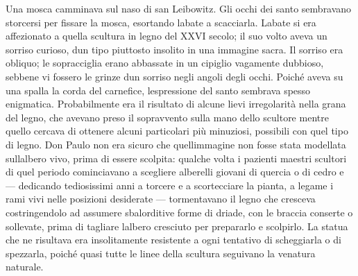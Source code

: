 Una mosca camminava sul naso di san Leibowitz. Gli occhi dei santo
sembravano storcersi per fissare la mosca, esortando
l\textquotesingle abate a scacciarla. L\textquotesingle abate si era
affezionato a quella scultura in legno del XXVI secolo; il suo volto
aveva un sorriso curioso, d\textquotesingle un tipo piuttosto insolito
in una immagine sacra. Il sorriso era obliquo; le sopracciglia erano
abbassate in un cipiglio vagamente dubbioso, sebbene vi fossero le
grinze d\textquotesingle un sorriso negli angoli degli occhi. Poiché
aveva su una spalla la corda del carnefice,
l\textquotesingle espressione del santo sembrava spesso enigmatica.
Probabilmente era il risultato di alcune lievi irregolarità nella grana
del legno, che avevano preso il sopravvento sulla mano dello scultore
mentre quello cercava di ottenere alcuni particolari più minuziosi,
possibili con quel tipo di legno. Don Paulo non era sicuro che
quell\textquotesingle immagine non fosse stata modellata
sull\textquotesingle albero vivo, prima di essere scolpita: qualche
volta i pazienti maestri scultori di quel periodo cominciavano a
scegliere alberelli giovani di quercia o di cedro e --- dedicando
tediosissimi anni a torcere e a scortecciare la pianta, a legame i rami
vivi nelle posizioni desiderate --- tormentavano il legno che cresceva
costringendolo ad assumere sbalorditive forme di driade, con le braccia
conserte o sollevate, prima di tagliare l\textquotesingle albero
cresciuto per prepararlo e scolpirlo. La statua che ne risultava era
insolitamente resistente a ogni tentativo di scheggiarla o di spezzarla,
poiché quasi tutte le linee della scultura seguivano la venatura
naturale.

